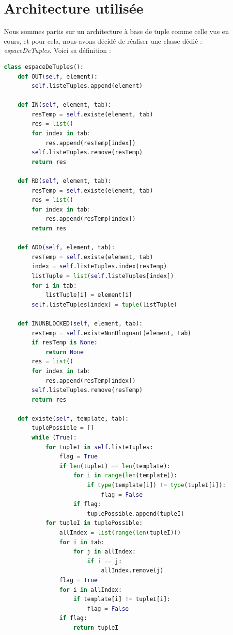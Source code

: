 \documentclass[a4paper,10pt]{article}
\begin{document}
    \clearpage
    
    
    \section{Architecture utilisée}

    Nous sommes partis sur un architecture à base de tuple comme celle vue en cours, et pour cela, nous avons décidé de réaliser une classe dédié : \textit{espaceDeTuples}. Voici sa définition :
    \begin{lstlisting}[language=Python]
class espaceDeTuples():
    def OUT(self, element):
        self.listeTuples.append(element)

    def IN(self, element, tab):
        resTemp = self.existe(element, tab)
        res = list()
        for index in tab:
            res.append(resTemp[index])
        self.listeTuples.remove(resTemp)
        return res

    def RD(self, element, tab):
        resTemp = self.existe(element, tab)
        res = list()
        for index in tab:
            res.append(resTemp[index])
        return res

    def ADD(self, element, tab):
        resTemp = self.existe(element, tab)
        index = self.listeTuples.index(resTemp)
        listTuple = list(self.listeTuples[index])
        for i in tab:
            listTuple[i] = element[i]
        self.listeTuples[index] = tuple(listTuple)

    def INUNBLOCKED(self, element, tab):
        resTemp = self.existeNonBloquant(element, tab)
        if resTemp is None:
            return None
        res = list()
        for index in tab:
            res.append(resTemp[index])
        self.listeTuples.remove(resTemp)
        return res

    def existe(self, template, tab):
        tuplePossible = []
        while (True):
            for tupleI in self.listeTuples:
                flag = True
                if len(tupleI) == len(template):
                    for i in range(len(template)):
                        if type(template[i]) != type(tupleI[i]):
                            flag = False
                    if flag:
                        tuplePossible.append(tupleI)
            for tupleI in tuplePossible:
                allIndex = list(range(len(tupleI)))
                for i in tab:
                    for j in allIndex:
                        if i == j:
                            allIndex.remove(j)
                flag = True
                for i in allIndex:
                    if template[i] != tupleI[i]:
                        flag = False
                if flag:
                    return tupleI


\end{lstlisting}
\end{document}
